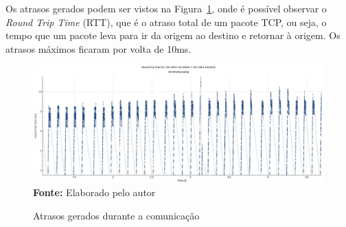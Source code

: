 Os atrasos gerados podem ser vistos na Figura~\ref{fig:delay}, onde é possível observar o \textit{Round Trip Time} (RTT), que é o atraso total de um pacote TCP, ou seja, o tempo que um pacote leva para ir da origem ao destino e retornar à origem. Os atrasos máximos ficaram por volta de 10ms. 

\begin{figure}[ht]
	\caption{Atrasos gerados durante a comunicação}
	\begin{center}
		\includegraphics[scale=0.35]{imagens/delay.jpg}\\
		{\small \textbf{Fonte:} Elaborado pelo autor}
    \end{center}\label{fig:delay}
\end{figure}
